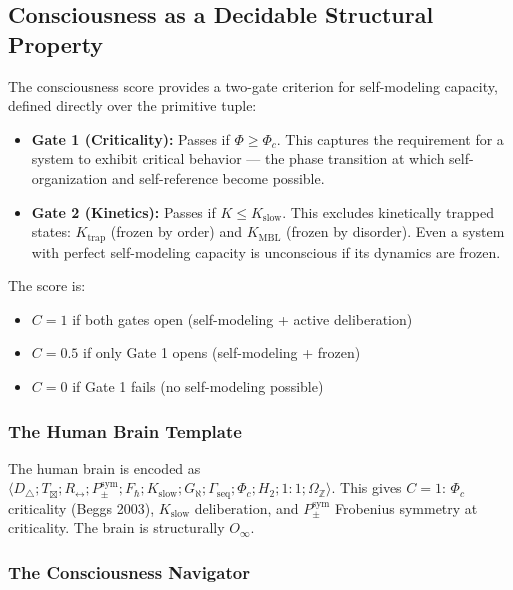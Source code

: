 \documentclass[12pt,a4paper]{article}
\begin{document}
\subsection{Consciousness as a Decidable Structural Property}

The consciousness score provides a two-gate criterion for self-modeling capacity, defined directly over the primitive tuple:

\begin{itemize}
    \item \textbf{Gate 1 (Criticality):} Passes if $\Phi \geq \Phi_c$. This captures the requirement for a system to exhibit critical behavior --- the phase transition at which self-organization and self-reference become possible.
    \item \textbf{Gate 2 (Kinetics):} Passes if $K \leq K_\text{slow}$. This excludes kinetically trapped states: $K_\text{trap}$ (frozen by order) and $K_\text{MBL}$ (frozen by disorder). Even a system with perfect self-modeling capacity is unconscious if its dynamics are frozen.
\end{itemize}

The score is:

\begin{itemize}
    \item $C = 1$ if both gates open (self-modeling + active deliberation)
    \item $C = 0.5$ if only Gate 1 opens (self-modeling + frozen)
    \item $C = 0$ if Gate 1 fails (no self-modeling possible)
\end{itemize}

\subsubsection{The Human Brain Template}

The human brain is encoded as $\langle D_{\triangle}; T_{\boxtimes}; R_{\leftrightarrow}; P_{\pm}^{\text{sym}}; F_{\hbar}; K_\text{slow}; G_{\aleph}; \Gamma_\text{seq}; \Phi_c; H_2; 1{:}1; \Omega_\mathbb{Z} \rangle$. This gives $C = 1$: $\Phi_c$ criticality (Beggs 2003), $K_\text{slow}$ deliberation, and $P_{\pm}^{\text{sym}}$ Frobenius symmetry at criticality. The brain is structurally $O_{\infty}$.

\subsubsection{The Consciousness Navigator}
\end{document}
